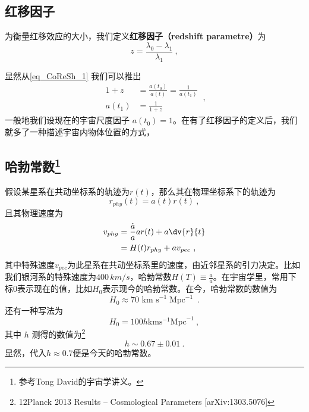 \subsection{红移因子}
\begin{definition}{}
为衡量红移效应的大小，我们定义\textbf{红移因子（redshift parametre）}为
\begin{equation}
z=\frac{\lambda_0-\lambda_1}{\lambda_1}~,
\end{equation}
\end{definition}
显然从\autoref{eq_CoReSh_1} 我们可以推出
\begin{equation}
\begin{aligned}
1+z&=\frac{a(t_0)}{a(t)}=\frac{1}{a(t_1)}\\
a(t_1)&=\frac{1}{1+z}
\end{aligned}~,
\end{equation}
一般地我们设现在的宇宙尺度因子 $a(t_0)=1$。在有了红移因子的定义后，我们就多了一种描述宇宙内物体位置的方式，

\subsection{哈勃常数\footnote{参考Tong David的宇宙学讲义。}}

假设某星系在共动坐标系的轨迹为$r(t)$，那么其在物理坐标系下的轨迹为
\begin{equation}
r_{phy}(t)=a(t)r(t)~,
\end{equation}
且其物理速度为
\begin{equation}
\begin{aligned}
v_{phy}& =\frac{\dot a}{a}ar(t)+a\dv{r}{t}\\
&=H(t)r_{phy}+av_{pec}~,
\end{aligned}
\end{equation}
其中特殊速度$v_{pec}$为此星系在共动坐标系里的速度，由近邻星系的引力决定。比如我们银河系的特殊速度为$400\,km/s$，哈勃常数$H(T)\equiv \frac{\dot a}{a}$。在宇宙学里，常用下标0表示现在的值，比如$H_0$表示现今的哈勃常数。在今，哈勃常数的数值为
\begin{equation}H_0\approx70\text{ km s}^{-1}\operatorname{Mpc}^{-1}~.
\end{equation}
还有一种写法为
\begin{equation}H_0=100h \mathrm{km} \mathrm{s}^{-1} \mathrm{Mpc}^{-1}~,\end{equation}
其中 $h$ 测得的数值为\footnote{12Planck 2013 Results – Cosmological Parameters [arXiv:1303.5076]}
\begin{equation}
h\sim 0.67 \pm 0.01~.
\end{equation}显然，代入$h\approx 0.7$便是今天的哈勃常数。

